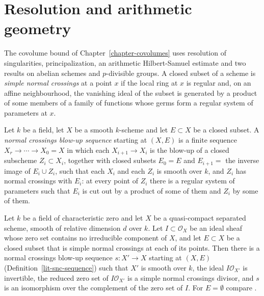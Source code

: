 \section{Resolution and arithmetic geometry}\label{section-lit-geometry}

The covolume bound of Chapter~\ref{chapter-covolumes} uses resolution of
singularities, principalization, an arithmetic Hilbert-Samuel estimate and
two results on abelian schemes and $p$-divisible groups. A closed subset of a
scheme is \emph{simple normal crossings} at a point $x$ if the local ring at
$x$ is regular and, on an affine neighbourhood, the vanishing ideal of the
subset is generated by a product of some members of a family of functions
whose germs form a regular system of parameters at $x$.

\begin{definition}\label{lit-snc-sequence}
Let $k$ be a field, let $X$ be a smooth $k$-scheme and let $E\subset X$ be a
closed subset. A \emph{normal crossings blow-up sequence} starting at $(X,E)$
is a finite sequence $X_r\to\cdots\to X_0=X$ in which each $X_{i+1}\to X_i$ is
the blow-up of a closed subscheme $Z_i\subset X_i$, together with closed
subsets $E_0=E$ and $E_{i+1}=$ the inverse image of $E_i\cup Z_i$, such that
each $X_i$ and each $Z_i$ is smooth over $k$, and $Z_i$ has normal crossings
with $E_i$: at every point of $Z_i$ there is a regular system of parameters
such that $E_i$ is cut out by a product of some of them and $Z_i$ by some of
them.
\end{definition}

\begin{theorem}\label{lit-principalization}
Let $k$ be a field of characteristic zero and let $X$ be a quasi-compact
separated scheme, smooth of relative dimension $d$ over $k$. Let
$I\subset\mathcal O_X$ be an ideal sheaf whose zero set contains no
irreducible component of $X$, and let $E\subset X$ be a closed subset that is
simple normal crossings at each of its points. Then there is a normal
crossings blow-up sequence $s:X'\to X$ starting at $(X,E)$
(Definition~\ref{lit-snc-sequence}) such that $X'$ is smooth over $k$, the
ideal $I\mathcal O_{X'}$ is invertible, the reduced zero set of
$I\mathcal O_{X'}$ is a simple normal crossings divisor, and $s$ is an
isomorphism over the complement of the zero set of $I$. For $E=\emptyset$ compare
\cite[Tag R021]{Res26}.
\end{theorem}

